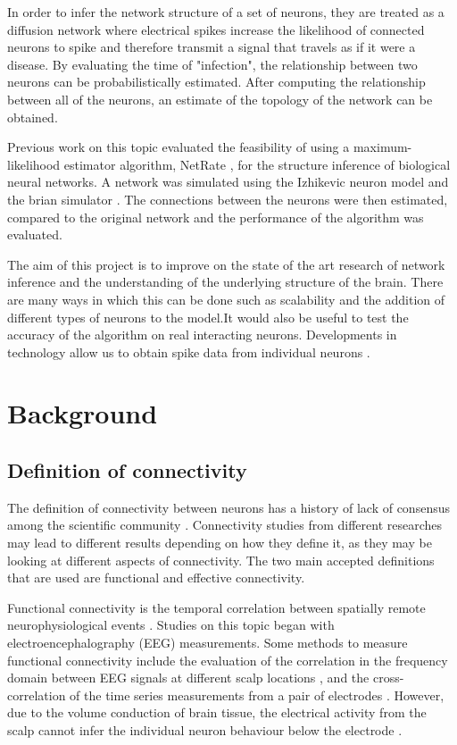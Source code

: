 \documentclass{article}
\begin{document}
In order to infer the network structure of a set of neurons, they are treated as a diffusion network where electrical spikes increase the likelihood of connected neurons to spike and therefore transmit a signal that travels as if it were a disease. By evaluating the time of "infection", the relationship between two neurons can be probabilistically estimated. After computing the relationship between all of the neurons, an estimate of the topology of the network can be obtained. 

Previous work on this topic \cite{pranav_report, alexandru2018estimating} evaluated the feasibility of using a maximum-likelihood estimator algorithm, NetRate \cite{rodriguez2011uncovering}, for the structure inference of biological neural networks. A network was simulated using the Izhikevic neuron model \cite{izhikevich2003simple} and the brian simulator \cite{10.3389/neuro.01.026.2009}. The connections between the neurons were then estimated, compared to the original network and the performance of the algorithm was evaluated.

The aim of this project is to improve on the state of the art research of network inference and the understanding of the underlying structure of the brain. There are many ways in which this can be done such as scalability and the addition of different types of neurons to the model.It would also be useful to test the accuracy of the algorithm on real interacting neurons. Developments in technology allow us to obtain spike data from individual neurons \cite{ito2016spontaneous, ito2014large, litke2004does}.


\section{Background}

\subsection{Definition of connectivity}

The definition of connectivity between neurons has a history of lack of consensus among the scientific community \cite{HORWITZ2003466}. Connectivity studies from different researches may lead to different results depending on how they define it, as they may be looking at different aspects of connectivity. The two main accepted definitions that are used are functional and effective connectivity.

Functional connectivity is the temporal correlation between spatially remote neurophysiological events \cite{friston1993functional}. Studies on this topic began with electroencephalography (EEG) measurements. Some methods to measure functional connectivity include the evaluation of the correlation in the frequency domain between EEG signals at different scalp locations \cite{pfurtscheller1999event}, and the cross-correlation of the time series measurements from a pair of electrodes \cite{gevins1985neurocognitive}. However, due to the volume conduction of brain tissue, the electrical activity from the scalp cannot infer the individual neuron behaviour below the electrode \cite{HORWITZ2003466}.
\end{document}

